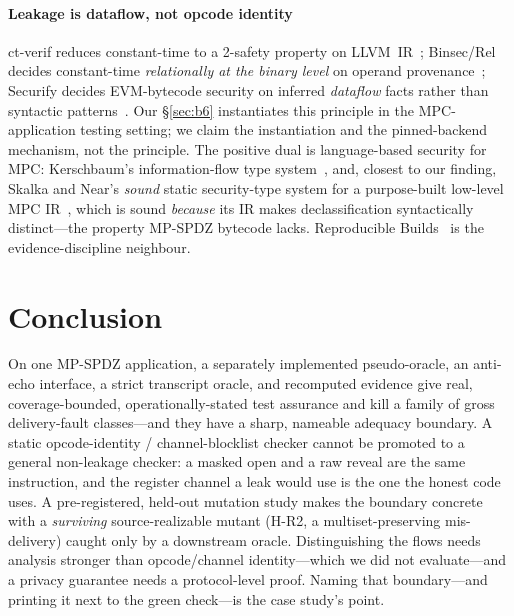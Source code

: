 \documentclass[conference]{IEEEtran}
\begin{document}
\paragraph{Leakage is dataflow, not opcode identity}
ct-verif reduces constant-time to a 2-safety property on LLVM~IR~\cite{ctverif}; Binsec/Rel
decides constant-time \emph{relationally at the binary level} on operand
provenance~\cite{binsecrel}; Securify decides EVM-bytecode security on inferred
\emph{dataflow} facts rather than syntactic patterns~\cite{securify}. Our \S\ref{sec:b6}
instantiates this principle in the MPC-application testing setting; we claim the instantiation
and the pinned-backend mechanism, not the principle. The positive dual is language-based
security for MPC: Kerschbaum's information-flow type system~\cite{kerschbaum}, and, closest to
our finding, Skalka and Near's \emph{sound} static security-type system for a purpose-built
low-level MPC IR~\cite{skalkanear,skalkanear2}, which is sound \emph{because} its IR makes
declassification syntactically distinct---the property MP-SPDZ bytecode lacks. Reproducible
Builds~\cite{reprobuilds} is the evidence-discipline neighbour.

\section{Conclusion}
\label{sec:conclusion}
On one MP-SPDZ application, a separately implemented pseudo-oracle, an anti-echo interface, a
strict transcript oracle, and recomputed evidence give real, coverage-bounded,
operationally-stated test assurance and kill a family of gross delivery-fault classes---and
they have a sharp, nameable adequacy boundary. A static opcode-identity / channel-blocklist
checker cannot be promoted to a general non-leakage checker: a masked open and a raw reveal
are the same instruction, and the register channel a leak would use is the one the honest code
uses. A pre-registered, held-out mutation study makes the boundary concrete with a
\emph{surviving} source-realizable mutant (H-R2, a multiset-preserving mis-delivery) caught
only by a downstream oracle. Distinguishing the flows needs analysis stronger than
opcode/channel identity---which we did not evaluate---and a privacy guarantee needs a
protocol-level proof. Naming that boundary---and printing it next to the green check---is the
case study's point.

\end{document}
